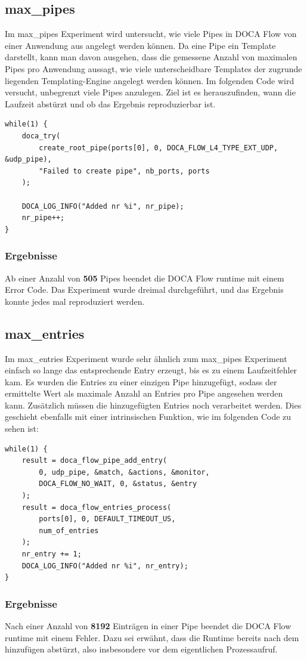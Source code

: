 \documentclass[paper=a4, fontsize=11pt]{scrartcl} %
\numberwithin{equation}{section} %
\numberwithin{figure}{section} %
\numberwithin{table}{section} %
\begin{document}
\subsection{max\_pipes}
Im max\_pipes Experiment wird untersucht, wie viele Pipes in DOCA Flow von einer Anwendung aus angelegt werden können. Da eine Pipe ein Template darstellt, kann man davon ausgehen, dass die gemessene Anzahl von maximalen Pipes pro Anwendung aussagt, wie viele unterscheidbare Templates der zugrunde liegenden Templating-Engine angelegt werden können. Im folgenden Code wird versucht, unbegrenzt viele Pipes anzulegen. Ziel ist es herauszufinden, wann die Laufzeit abstürzt und ob das Ergebnis reproduzierbar ist. 
\newpage
\begin{verbatim}
while(1) {
    doca_try(
        create_root_pipe(ports[0], 0, DOCA_FLOW_L4_TYPE_EXT_UDP, &udp_pipe), 
        "Failed to create pipe", nb_ports, ports
    );

    DOCA_LOG_INFO("Added nr %i", nr_pipe);
    nr_pipe++;
}
\end{verbatim}
\subsubsection{Ergebnisse}
Ab einer Anzahl von \textbf{505} Pipes beendet die DOCA Flow runtime mit einem Error Code. Das Experiment wurde dreimal durchgeführt, und das Ergebnis konnte jedes mal reproduziert werden.
\subsection{max\_entries}
Im max\_entries Experiment wurde sehr ähnlich zum max\_pipes Experiment einfach so lange das entsprechende Entry erzeugt, bis es zu einem Laufzeitfehler kam. Es wurden die Entries zu einer einzigen Pipe hinzugefügt, sodass der ermittelte Wert als maximale Anzahl an Entries pro Pipe angesehen werden kann. Zusätzlich müssen die hinzugefügten Entries noch verarbeitet werden. Dies geschieht ebenfalls mit einer intrinsischen Funktion, wie im folgenden Code zu sehen ist:
\begin{verbatim}
while(1) {
    result = doca_flow_pipe_add_entry(
        0, udp_pipe, &match, &actions, &monitor, 
        DOCA_FLOW_NO_WAIT, 0, &status, &entry
    );
    result = doca_flow_entries_process(
        ports[0], 0, DEFAULT_TIMEOUT_US, 
        num_of_entries
    );
    nr_entry += 1;
    DOCA_LOG_INFO("Added nr %i", nr_entry);
}
\end{verbatim}
\subsubsection{Ergebnisse}
Nach einer Anzahl von \textbf{8192} Einträgen in einer Pipe beendet die DOCA Flow runtime mit einem Fehler. Dazu sei erwähnt, dass die Runtime bereits nach dem hinzufügen abstürzt, also insbesondere vor dem eigentlichen Prozessaufruf.
\end{document}
